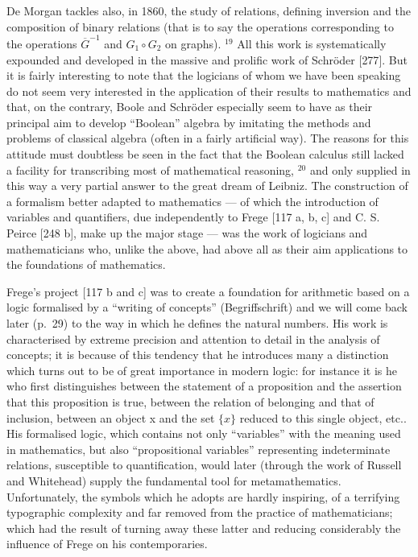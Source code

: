 De Morgan tackles also, in 1860, the study of relations, defining inversion and the composition of binary relations (that is to say the operations corresponding to the operations \(\overline{G}^{-1}\) and \(G_{1} \circ G_{2}\) on graphs). \(^{19}\) All this work is systematically expounded and developed in the massive and prolific work of Schröder {[}277{]}. But it is fairly interesting to note that the logicians of whom we have been speaking do not seem very interested in the application of their results to mathematics and that, on the contrary, Boole and Schröder especially seem to have as their principal aim to develop ``Boolean'' algebra by imitating the methods and problems of classical algebra (often in a fairly artificial way). The reasons for this attitude must doubtless be seen in the fact that the Boolean calculus still lacked a facility for transcribing most of mathematical reasoning, \(^{20}\) and only supplied in this way a very partial answer to the great dream of Leibniz. The construction of a formalism better adapted to mathematics --- of which the introduction of variables and quantifiers, due independently to Frege {[}117 a, b, c{]} and C. S. Peirce {[}248 b{]}, make up the major stage --- was the work of logicians and mathematicians who, unlike the above, had above all as their aim applications to the foundations of mathematics.

Frege's project {[}117 b and c{]} was to create a foundation for arithmetic based on a logic formalised by a ``writing of concepts'' (Begriffschrift) and we will come back later (p.~29) to the way in which he defines the natural numbers. His work is characterised by extreme precision and attention to detail in the analysis of concepts; it is because of this tendency that he introduces many a distinction which turns out to be of great importance in modern logic: for instance it is he who first distinguishes between the statement of a proposition and the assertion that this proposition is true, between the relation of belonging and that of inclusion, between an object x and the set \(\{x\}\) reduced to this single object, etc.. His formalised logic, which contains not only ``variables'' with the meaning used in mathematics, but also ``propositional variables'' representing indeterminate relations, susceptible to quantification, would later (through the work of Russell and Whitehead) supply the fundamental tool for metamathematics. Unfortunately, the symbols which he adopts are hardly inspiring, of a terrifying typographic complexity and far removed from the practice of mathematicians; which had the result of turning away these latter and reducing considerably the influence of Frege on his contemporaries.

